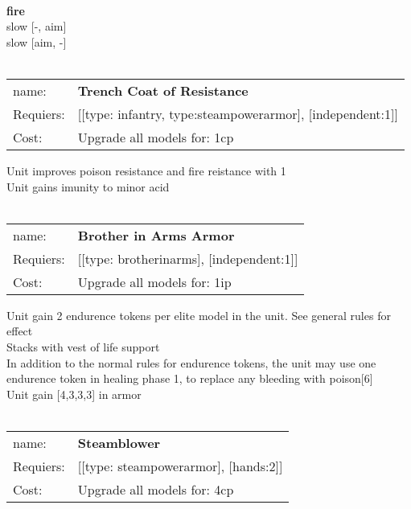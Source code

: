 \ \\ {\bf fire } \\
slow [-, aim] \\
slow [aim, -] \\

\ \\
\begin{tabular}{ll}
name: & {\bf Trench Coat of Resistance } \\
Requiers: & [[type: infantry, type:steampowerarmor], [independent:1]] \\
Cost: & Upgrade all models for: 1cp \\
\end{tabular}

Unit improves poison resistance and fire reistance with 1\\ 
Unit gains imunity to minor acid\\ 









\ \\
\begin{tabular}{ll}
name: & {\bf Brother in Arms Armor } \\
Requiers: & [[type: brotherinarms], [independent:1]] \\
Cost: & Upgrade all models for: 1ip \\
\end{tabular}

Unit gain 2 endurence tokens per elite model in the unit. See general rules for effect\\ 
Stacks with vest of life support\\ 
In addition to the normal rules for endurence tokens, the unit may use one endurence token in healing phase 1, to replace any bleeding with poison[6]\\ 
Unit gain [4,3,3,3] in armor\\ 









\ \\
\begin{tabular}{ll}
name: & {\bf Steamblower } \\
Requiers: & [[type: steampowerarmor], [hands:2]] \\
Cost: & Upgrade all models for: 4cp \\
\end{tabular}



